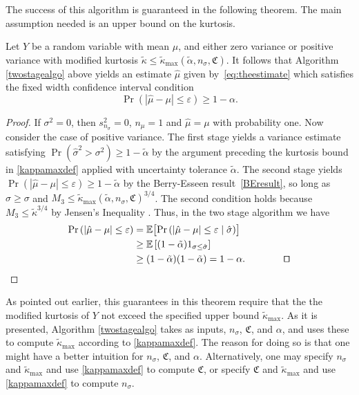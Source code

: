 \documentclass[graybox]{svmult}
\newcommand{\fudge}{\mathfrak{C}}
\newcommand\e{\mathbb{E}}
\newcommand{\Prob}{\Pr}
\newcommand{\abs}[1]{\left|#1\right|}
\newcommand{\hmu}{\hat{\mu}}
\newcommand{\hsigma}{\hat{\sigma}}
\newcommand{\tkappa}{\tilde{\kappa}}
\def\abs#1{\ensuremath{\left \lvert #1 \right \rvert}}
\begin{document}
The success of this algorithm is guaranteed in the following theorem.  The main assumption needed is an upper bound on the kurtosis.

\begin{theorem} \label{mainadaptthm} 
Let $Y$ be a random variable with mean $\mu$, and either zero variance or positive variance with modified kurtosis $\tkappa \le \tilde\kappa_{\max}(\tilde\alpha,n_\sigma,\fudge)$.  It follows that Algorithm \ref{twostagealgo} above yields an estimate
$\hat\mu$ given by~\eqref{eq:theestimate} which satisfies the fixed width confidence interval condition
$$\Pr( |\hat\mu-\mu|\le\varepsilon)\ge 1-\alpha.$$
\end{theorem}
\begin{proof}
\smartqed  
If $\sigma^2=0$, then $s_{n_\sigma}^2=0$, $n_\mu=1$ and $\hmu=\mu$ with probability one.  Now consider the case of positive variance.
The first stage yields a variance estimate satisfying
$
\Pr( \hsigma^2 >\sigma^2)\ge 1-\tilde\alpha
$
by the argument preceding the kurtosis bound in \eqref{kappamaxdef} applied with uncertainty tolerance $\tilde\alpha$.
The second stage yields
$\Pr( |\hat\mu-\mu|\le\varepsilon)\ge 1-\tilde\alpha$
by the Berry-Esseen result~\eqref{BEresult},
so long as $\hat\sigma\ge\sigma$
and $M_3\le \tilde\kappa_{\max}(\tilde\alpha,n_\sigma,\fudge)^{3/4}$.
The second condition holds because $M_3 \le \tkappa^{3/4}$ by Jensen's Inequality \citep[8.4.b]{LinBai10a}.
Thus, in the two stage algorithm we have
\begin{align*}
\Prob\left(\abs{\hmu-\mu} \le \varepsilon \right) &
= \e\bigl[\Prob\left(\abs{\hmu-\mu} \le \varepsilon \mid \hsigma \right) \bigr] \\
& \ge \e\left[(1-\tilde\alpha) 1_{\sigma\le\hsigma}\right]\\
& \ge (1-\tilde\alpha) (1-\tilde\alpha) = 1-\alpha.\qquad \qquad \qed
\end{align*}
\end{proof}

\begin{remark} As pointed out earlier, this guarantees in this theorem require that the the modified kurtosis of $Y$ not exceed the specified upper bound $\tkappa_{\max}$.  As it is presented, Algorithm \ref{twostagealgo} takes as inputs, $n_\sigma$, $\fudge$, and $\alpha$, and uses these to compute  $\tkappa_{\max}$ according to \eqref{kappamaxdef}.  The reason for doing so is that one might have a better intuition for $n_\sigma$, $\fudge$, and $\alpha$.  Alternatively, one may specify $n_\sigma$ and $\tkappa_{\max}$ and use \eqref{kappamaxdef} to compute $\fudge$, or specify $\fudge$ and $\tkappa_{\max}$ and use \eqref{kappamaxdef} to compute $n_\sigma$.
\end{remark}
\end{document}

